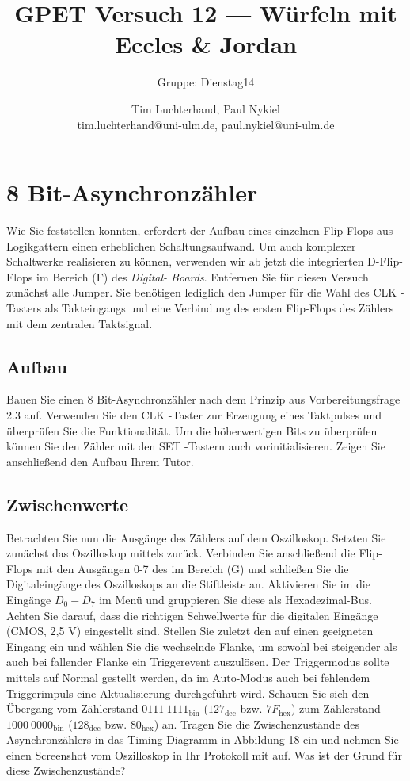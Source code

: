 \documentclass[10pt]{scrreprt}
\author{Tim Luchterhand, Paul Nykiel \protect\\ tim.luchterhand@uni-ulm.de, paul.nykiel@uni-ulm.de}
\title{GPET Versuch 12 --- Würfeln mit Eccles \& Jordan}
\subtitle{Gruppe: Dienstag14}
\begin{document}
    \maketitle

    \section{8 Bit-Asynchronzähler}
    Wie Sie feststellen konnten, erfordert der Aufbau eines einzelnen Flip-Flops aus Logikgattern
    einen erheblichen Schaltungsaufwand. Um auch komplexer Schaltwerke realisieren zu
    können, verwenden wir ab jetzt die integrierten D-Flip-Flops im Bereich (F) des \textit{Digital-
    Boards}. Entfernen Sie für diesen Versuch zunächst alle Jumper. Sie benötigen lediglich
    den Jumper für die Wahl des CLK -Tasters als Takteingangs und eine Verbindung des
    ersten Flip-Flops des Zählers mit dem zentralen Taktsignal.

    \subsection{Aufbau}
    Bauen Sie einen 8 Bit-Asynchronzähler nach dem Prinzip aus Vorbereitungsfrage 2.3 auf.
    Verwenden Sie den CLK -Taster zur Erzeugung eines Taktpulses und überprüfen Sie die
    Funktionalität. Um die höherwertigen Bits zu überprüfen können Sie den Zähler mit den
    SET -Tastern auch vorinitialisieren. Zeigen Sie anschließend den Aufbau Ihrem Tutor.

    \subsection{Zwischenwerte}
    Betrachten Sie nun die Ausgänge des Zählers auf dem Oszilloskop. Setzten Sie zunächst
    das Oszilloskop mittels  zurück. Verbinden Sie anschließend die Flip-Flops
    mit den Ausgängen 0-7 des im Bereich (G) und schließen Sie die Digitaleingänge des
    Oszilloskops an die Stiftleiste an. Aktivieren Sie im die Eingänge $D_0 -D_7$ im 
    Menü und gruppieren Sie diese als Hexadezimal-Bus. Achten Sie darauf, dass die richtigen
    Schwellwerte für die digitalen Eingänge (CMOS, 2,5 V) eingestellt sind. Stellen Sie zuletzt
    den  auf einen geeigneten Eingang ein und wählen Sie die wechselnde Flanke,
    um sowohl bei steigender als auch bei fallender Flanke ein Triggerevent auszulösen. Der
    Triggermodus sollte mittels  auf Normal gestellt werden, da im
    Auto-Modus auch bei fehlendem Triggerimpuls eine Aktualisierung durchgeführt wird.
    Schauen Sie sich den Übergang vom Zählerstand $0111\ 1111_\text{bin}$ ($127_\text{dec}$ bzw. $7F_\text{hex}$) zum
    Zählerstand $1000\ 0000_\text{bin}$ ($128_\text{dec}$ bzw. $80_\text{hex}$) an. Tragen Sie die Zwischenzustände des
    Asynchronzählers in das Timing-Diagramm in Abbildung 18 ein und nehmen Sie einen
    Screenshot vom Oszilloskop in Ihr Protokoll mit auf. Was ist der Grund für diese
    Zwischenzustände?
\end{document}

